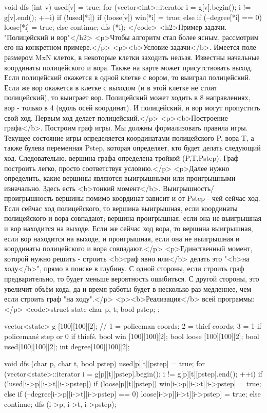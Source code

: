 void dfs (int v) {
	used[v] = true;
	for (vector<int>::iterator i = g[v].begin(); i != g[v].end(); ++i)
		if (!used[*i]) {
			if (loose[v])
				win[*i] = true;
			else if (--degree[*i] == 0)
				loose[*i] = true;
			else
				continue;
			dfs (*i);
		}
}</code>
<h2>Пример задачи. "Полицейский и вор"</h2>
<p>Чтобы алгоритм стал более ясным, рассмотрим его на конкретном примере.</p>
<p><b>Условие задачи</b>. Имеется поле размером MxN клеток, в некоторые клетки заходить нельзя. Известны начальные координаты полицейского и вора. Также на карте может присутствовать выход. Если полицейский окажется в одной клетке с вором, то выиграл полицейский. Если же вор окажется в клетке с выходом (и в этой клетке не стоит полицейский), то выиграет вор. Полицейский может ходить в 8 направлениях, вор - только в 4 (вдоль осей координат). И полицейский, и вор могут пропустить свой ход. Первым ход делает полицейский.</p>
<p><b>Построение графа</b>. Построим граф игры. Мы должны формализовать правила игры. Текущее состояние игры определяется координатами полицейского P, вора T, а также булева переменная Pstep, которая определяет, кто будет делать следующий ход. Следовательно, вершина графа определена тройкой (P,T,Pstep). Граф построить легко, просто соответствуя условию.</p>
<p>Далее нужно определить, какие вершины являются выигрышными или проигрышными изначально. Здесь есть <b>тонкий момент</b>. Выигрышность/проигрышность вершины помимо координат зависит и от Pstep - чей сейчас ход. Если сейчас ход полицейского, то вершина выигрышная, если координаты полицейского и вора совпадают; вершина проигрышная, если она не выигрышная и вор находится на выходе. Если же сейчас ход вора, то вершина выигрышная, если вор находится на выходе, и проигрышная, если она не выигрышная и координаты полицейского и вора совпадают.</p>
<p>Единственный момент, которой нужно решить - строить <b>граф явно или</b> делать это "<b>на ходу</b>", прямо в поиске в глубину. С одной стороны, если строить граф предварительно, то будет меньше вероятность ошибиться. С другой стороны, это увеличит объём кода, да и время работы будет в несколько раз медленнее, чем если строить граф "на ходу".</p>
<p><b>Реализация</b> всей программы:</p>
<code>struct state {
	char p, t;
	bool pstep;
};

vector<state> g [100][100][2];
// 1 = policeman coords; 2 = thief coords; 3 = 1 if policeman\'s step or 0 if thief\'s.
bool win [100][100][2];
bool loose [100][100][2];
bool used[100][100][2];
int degree[100][100][2];

void dfs (char p, char t, bool pstep) {
	used[p][t][pstep] = true;
	for (vector<state>::iterator i = g[p][t][pstep].begin(); i != g[p][t][pstep].end(); ++i)
		if (!used[i->p][i->t][i->pstep]) {
			if (loose[p][t][pstep])
				win[i->p][i->t][i->pstep] = true;
			else if (--degree[i->p][i->t][i->pstep] == 0)
				loose[i->p][i->t][i->pstep] = true;
			else
				continue;
			dfs (i->p, i->t, i->pstep);
		}
}


